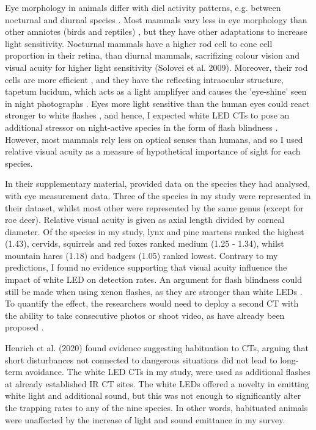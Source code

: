 Eye morphology in animals differ with diel activity patterns, e.g. between nocturnal and diurnal species \autocite{Schmitz2010}. Most mammals vary less in eye morphology than other amniotes (birds and reptiles) \autocite{Schmitz2010, Hall2012}, but they have other adaptations to increase light sensitivity. Nocturnal mammals have a higher rod cell to cone cell proportion in their retina, than diurnal mammals, sacrifizing colour vision and visual acuity for higher light sensitivity (Solovei et al. 2009). Moreover, their rod cells are more efficient \autocite{Solovei2009}, and they have the reflecting intraocular structure, tapetum lucidum, which acts as a light amplifyer and causes the 'eye-shine' seen in night photographs \autocite{Ollivier2004}.
Eyes more light sensitive than the human eyes could react stronger to white flashes \autocite{Dryja2005}, and hence, I expected white LED CTs to pose an additional stressor on night-active species in the form of flash blindness \autocite{Nakagawara2001}. However, most mammals rely less on optical senses than humans, and so I used relative visual acuity as a measure of hypothetical importance of sight for each species.

In their supplementary material, \textcite{Hall2012} provided data on the species they had analysed, with eye measurement data. Three of the species in my study were represented in their dataset, whilst most other were represented by the same genus (except for roe deer). Relative visual acuity is given as axial length divided by corneal diameter.
Of the species in my study, lynx and pine martens ranked the highest (1.43), cervids, squirrels and red foxes ranked medium (1.25 - 1.34), whilst mountain hares (1.18) and badgers (1.05) ranked lowest. 
Contrary to my predictions, I found no evidence supporting that visual acuity influence the impact of white LED on detection rates. 
An argument for flash blindness could still be made when using xenon flashes, as they are stronger than white LEDs \autocite{Rovero2013}.
To quantify the effect, the researchers would need to deploy a second CT with the ability to take consecutive photos or shoot video, as have already been proposed \autocite{Glen2013a, Henrich2020}.


Henrich et al. (2020) found evidence suggesting habituation to CTs, arguing that short disturbances not connected to dangerous situations did not lead to long-term avoidance.
The white LED CTs in my study, were used as additional flashes at already established IR CT sites. 
The white LEDs offered a novelty in emitting white light and additional sound, but this was not enough to significantly alter the trapping rates to any of the nine species.
In other words, habituated animals were unaffected by the increase of light and sound emittance in my survey.

